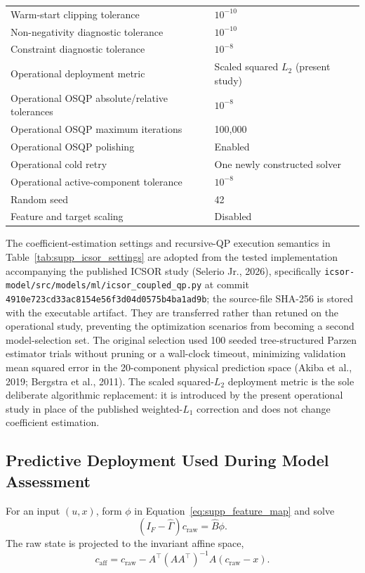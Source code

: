 \documentclass[a4paper,fleqn]{cas-sc}
\begin{document}
\begin{table}[H]
\begin{tabular}{ll}
Warm-start clipping tolerance & $10^{-10}$ \\
Non-negativity diagnostic tolerance & $10^{-10}$ \\
Constraint diagnostic tolerance & $10^{-8}$ \\
Operational deployment metric & Scaled squared $L_2$ (present study) \\
Operational OSQP absolute/relative tolerances & $10^{-8}$ \\
Operational OSQP maximum iterations & 100,000 \\
Operational OSQP polishing & Enabled \\
Operational cold retry & One newly constructed solver \\
Operational active-component tolerance & $10^{-8}$ \\
Random seed & 42 \\
Feature and target scaling & Disabled \\
\bottomrule
\end{tabular}
\end{table}

The coefficient-estimation settings and recursive-QP execution semantics in Table~\ref{tab:supp_icsor_settings} are adopted from the tested implementation accompanying the published ICSOR study (Selerio Jr., 2026), specifically \texttt{icsor-model/src/models/ml/icsor\_coupled\_qp.py} at commit \texttt{4910e723cd33ac8154e56f3d04d0575b4ba1ad9b}; the source-file SHA-256 is stored with the executable artifact. They are transferred rather than retuned on the operational study, preventing the optimization scenarios from becoming a second model-selection set. The original selection used 100 seeded tree-structured Parzen estimator trials without pruning or a wall-clock timeout, minimizing validation mean squared error in the 20-component physical prediction space (Akiba et al., 2019; Bergstra et al., 2011). The scaled squared-$L_2$ deployment metric is the sole deliberate algorithmic replacement: it is introduced by the present operational study in place of the published weighted-$L_1$ correction and does not change coefficient estimation.

\subsection{Predictive Deployment Used During Model Assessment}

For an input $(u,x)$, form $\phi$ in Equation~\eqref{eq:supp_feature_map} and solve
\begin{equation}
(I_F-\widehat\Gamma)c_{\mathrm{raw}}=\widehat B\phi.
\end{equation}
The raw state is projected to the invariant affine space,
\begin{equation}
c_{\mathrm{aff}}=c_{\mathrm{raw}}
-A^\top(AA^\top)^{-1}A(c_{\mathrm{raw}}-x).
\end{equation}
\end{document}

